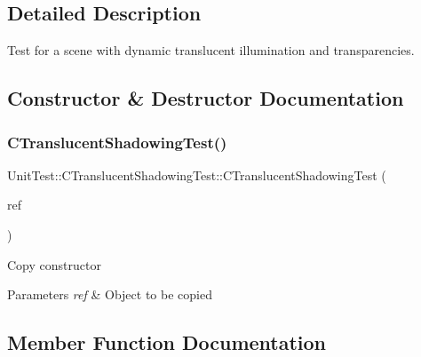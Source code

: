 \subsection{Detailed Description}
Test for a scene with dynamic translucent illumination and transparencies. 

\subsection{Constructor \& Destructor Documentation}
\mbox{\label{class_unit_test_1_1_c_translucent_shadowing_test_ac2abacd427b29b315eea6d4e95ec2852}} 
\subsubsection{\texorpdfstring{CTranslucentShadowingTest()}{CTranslucentShadowingTest()}}
{\footnotesize\ttfamily Unit\+Test\+::\+C\+Translucent\+Shadowing\+Test\+::\+C\+Translucent\+Shadowing\+Test (\begin{DoxyParamCaption}\item[{const \mbox{\hyperlink{class_unit_test_1_1_c_translucent_shadowing_test}{C\+Translucent\+Shadowing\+Test}} \&}]{ref }\end{DoxyParamCaption})\hspace{0.3cm}{\ttfamily [inline]}}

Copy constructor 
\begin{DoxyParams}{Parameters}
{\em ref} & Object to be copied \\
\hline
\end{DoxyParams}


\subsection{Member Function Documentation}
\mbox{\label{class_unit_test_1_1_c_translucent_shadowing_test_a231fbde217715f805edd8afd71e46db4}} 
